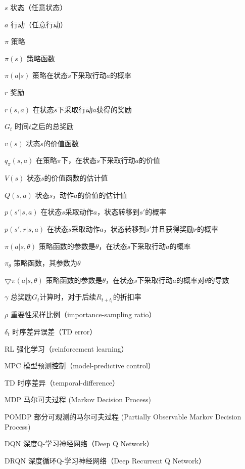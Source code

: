 \begin{denotation}[3cm]
\item[$s$] 状态（任意状态）
\item[$a$] 行动（任意行动）
\item[$\pi$] 策略
\item[$\pi(s)$] 策略函数
\item[$\pi(a|s)$] 策略在状态$s$下采取行动$a$的概率
\item[$r$] 奖励
\item[$r(s, a)$] 在状态$s$下采取行动$a$获得的奖励
\item[$G_t$] 时间$t$之后的总奖励
\item[$v(s)$] 状态$s$的价值函数
\item[$q_\pi(s, a)$] 在策略$\pi$下，在状态$s$下采取行动$a$的价值
\item[$V(s)$] 状态$s$的价值函数的估计值
\item[$Q(s, a)$] 状态$s$，动作$a$的价值的估计值
\item[$p(s'|s, a)$] 在状态$s$采取动作$a$，状态转移到$s'$的概率
\item[$p(s', r|s, a)$] 在状态$s$采取动作$a$，状态转移到$s'$并且获得奖励$r$的概率
\item[$\pi(a|s, \theta)$] 策略函数的参数是$\theta$，在状态$s$下采取行动$a$的概率
\item[$\pi_\theta$] 策略函数，其参数为$\theta$
\item[$\bigtriangledown \pi(a|s, \theta)$] 策略函数的参数是$\theta$，在状态$s$下采取行动$a$的概率对$\theta$的导数
\item[$\gamma$] 总奖励$G_t$计算时，对于后续$R_{t+t_i}$的折扣率
\item[$\rho$] 重要性采样比例（importance-sampling ratio）
\item[$\delta_t$] 时序差异误差（TD error）
\item[RL] 强化学习（reinforcement learning）
\item[MPC] 模型预测控制（model-predictive control）
\item[TD] 时序差异（temporal-difference）
\item[MDP] 马尔可夫过程 (Markov Decision Process)
\item[POMDP] 部分可观测的马尔可夫过程 (Partially Observable Markov Decision Process)
\item[DQN] 深度Q-学习神经网络（Deep Q Network）
\item[DRQN] 深度循环Q-学习神经网络（Deep Recurrent Q Network）
\end{denotation}
